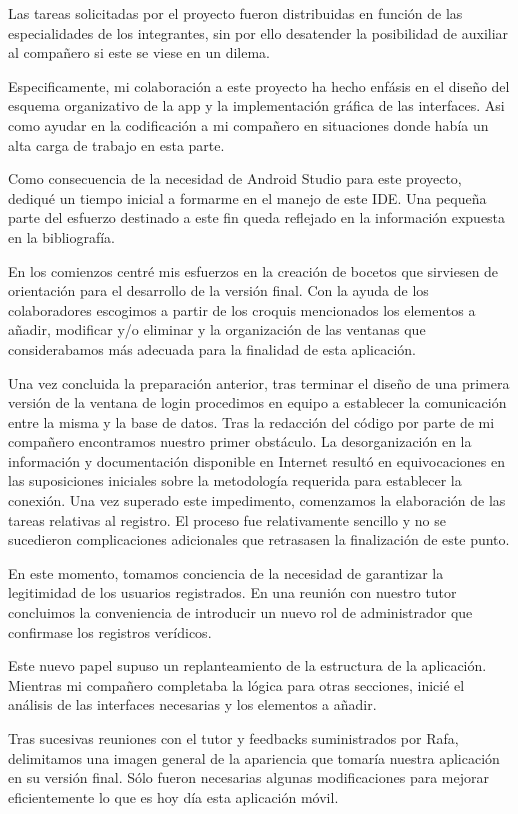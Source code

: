\documentclass[11pt,spanish,
		listoftables,listoffigures]
		{tfgplantilla}
\begin{document}
Las tareas solicitadas por el proyecto fueron distribuidas en función de las especialidades de los integrantes, sin por ello desatender la posibilidad de auxiliar al compañero si este se viese en un dilema.

Especificamente, mi colaboración a este proyecto ha hecho enfásis en el diseño del esquema organizativo de la app y la implementación gráfica de las interfaces. Asi como ayudar en la codificación a mi compañero en situaciones donde había un alta carga de trabajo en esta parte.

Como consecuencia de la necesidad de Android Studio para este proyecto, dediqué un tiempo inicial a formarme en el manejo de este IDE. Una pequeña parte del esfuerzo destinado a este fin queda reflejado en la información expuesta en la bibliografía.

En los comienzos centré mis esfuerzos en la creación de bocetos que sirviesen de orientación para el desarrollo de la versión final. Con la ayuda de los colaboradores escogimos a partir de los croquis mencionados los elementos a añadir, modificar y/o eliminar y la organización de las ventanas que considerabamos más adecuada para la finalidad de esta aplicación.

Una vez concluida la preparación anterior, tras terminar el diseño de una primera versión de la ventana de login procedimos en equipo a establecer la comunicación entre la misma y la base de datos.
Tras la redacción del código por parte de mi compañero encontramos nuestro primer obstáculo. La desorganización en la información y documentación disponible en Internet resultó en equivocaciones en las suposiciones iniciales sobre la metodología requerida para establecer la conexión.
Una vez superado este impedimento, comenzamos la elaboración de las tareas relativas al registro. El proceso fue relativamente sencillo y no se sucedieron complicaciones adicionales que retrasasen la finalización de este punto.

En este momento, tomamos conciencia de la necesidad de garantizar la legitimidad de los usuarios registrados. En una reunión con nuestro tutor concluimos la conveniencia de introducir un nuevo rol de administrador que confirmase los registros verídicos. 

Este nuevo papel supuso un replanteamiento de la estructura de la aplicación. Mientras mi compañero completaba la lógica para otras secciones, inicié el análisis de las interfaces necesarias y los elementos a añadir.

Tras sucesivas reuniones con el tutor y feedbacks suministrados por Rafa, delimitamos una imagen general de la apariencia que tomaría nuestra aplicación en su versión final. Sólo fueron necesarias algunas modificaciones para mejorar eficientemente lo que es hoy día esta aplicación móvil.
\end{document}

